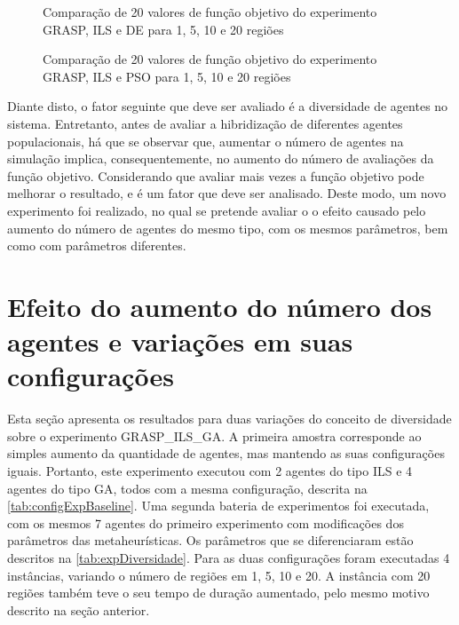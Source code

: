\begin{figure}
    \centering
    \caption{Comparação de 20 valores de função objetivo do experimento GRASP, ILS e DE para 1, 5, 10 e 20 regiões}
    
    \label{fig:A1boxplot}
\end{figure}

\begin{figure}
    \centering
    \caption{Comparação de 20 valores de função objetivo do experimento GRASP, ILS e PSO para 1, 5, 10 e 20 regiões}
    
    \label{fig:A2boxplot}
\end{figure}

Diante disto, o fator seguinte que deve ser avaliado é a diversidade de agentes no sistema. Entretanto, antes de avaliar a hibridização de diferentes agentes populacionais, há que se observar que, aumentar o número de agentes na simulação implica, consequentemente, no aumento do número de avaliações da função objetivo. Considerando que avaliar mais vezes a função objetivo pode melhorar o resultado, e é um fator que deve ser analisado. Deste modo, um novo  experimento foi realizado, no qual se pretende avaliar o o efeito causado pelo aumento do número de agentes do mesmo tipo, com os mesmos parâmetros, bem como com parâmetros diferentes. 

\section{Efeito do aumento do número dos agentes e variações em suas configurações}
\label{sec:aumentandoAgentes}

Esta seção apresenta os resultados para duas variações do conceito de diversidade sobre o experimento GRASP\_ILS\_GA. A primeira amostra corresponde ao simples aumento da quantidade de agentes, mas mantendo as suas configurações iguais. Portanto, este experimento executou com 2 agentes do tipo ILS e 4 agentes do tipo GA, todos com a mesma configuração, descrita na \autoref{tab:configExpBaseline}. Uma segunda bateria de experimentos foi executada, com os mesmos 7 agentes do primeiro experimento com modificações dos parâmetros das metaheurísticas. Os parâmetros que se diferenciaram estão descritos na \autoref{tab:expDiversidade}. Para as duas configurações foram executadas 4 instâncias, variando o número de regiões em 1, 5, 10 e 20. A instância com 20 regiões também teve o seu tempo de duração aumentado, pelo mesmo motivo descrito na seção anterior. 

